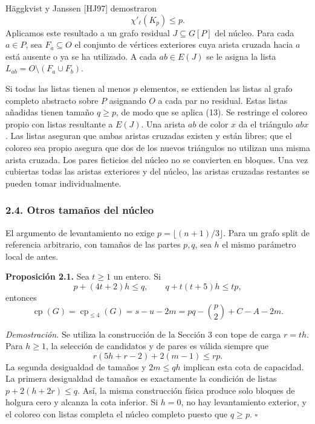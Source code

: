 \documentclass[spanish,11pt,a4paper]{article}
\begin{document}
Häggkvist y Janssen {[}HJ97{]} demostraron \[
\chi'_{\ell}(K_p)\le p. \tag{13}
\] Aplicamos este resultado a un grafo residual \(J\subseteq G[P]\) del
núcleo. Para cada \(a\in P\), sea \(F_a\subseteq O\) el conjunto de
vértices exteriores cuya arista cruzada hacia \(a\) está ausente o ya se
ha utilizado. A cada \(ab\in E(J)\) se le asigna la lista
\(L_{ab}=O\setminus(F_a\cup F_b)\).

Si todas las listas tienen al menos \(p\) elementos, se extienden las
listas al grafo completo abstracto sobre \(P\) asignando \(O\) a cada
par no residual. Estas listas añadidas tienen tamaño \(q\ge p\), de modo
que se aplica (13). Se restringe el coloreo propio con listas resultante
a \(E(J)\). Una arista \(ab\) de color \(x\) da el triángulo \(abx\).
Las listas aseguran que ambas aristas cruzadas existen y están libres;
que el coloreo sea propio asegura que dos de los nuevos triángulos no
utilizan una misma arista cruzada. Los pares ficticios del núcleo no se
convierten en bloques. Una vez cubiertas todas las aristas exteriores y
del núcleo, las aristas cruzadas restantes se pueden tomar
individualmente.

\subsubsection{2.4. Otros tamaños del
núcleo}\label{otros-tamauxf1os-del-nuxfacleo}

El argumento de levantamiento no exige \(p=\lfloor(n+1)/3\rfloor\). Para
un grafo split de referencia arbitrario, con tamaños de las partes
\(p,q\), sea \(h\) el mismo parámetro local de antes.

\textbf{Proposición 2.1.} Sea \(t\ge1\) un entero. Si \[
p+(4t+2)h\le q,\qquad q+t(t+5)h\le tp,
\] entonces \[
\operatorname{cp}(G)=\operatorname{cp}_{\le4}(G)
=s-u-2m=pq-\binom p2+C-A-2m.
\]

\emph{Demostración.} Se utiliza la construcción de la Sección 3 con tope
de carga \(r=th\). Para \(h\ge1\), la selección de candidatos y de pares
es válida siempre que \[
r(5h+r-2)+2(m-1)\le rp.
\] La segunda desigualdad de tamaños y \(2m\le qh\) implican esta cota
de capacidad. La primera desigualdad de tamaños es exactamente la
condición de listas \(p+2(h+2r)\le q\). Así, la misma construcción
física produce solo bloques de holgura cero y alcanza la cota inferior.
Si \(h=0\), no hay levantamiento exterior, y el coloreo con listas
completa el núcleo completo puesto que \(q\ge p\). \(\square\)
\end{document}
